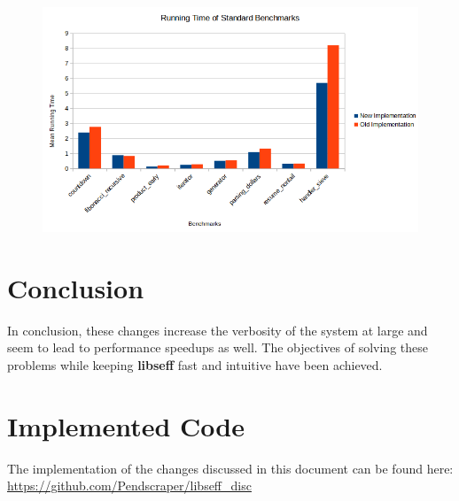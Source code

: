 \documentclass[logo,bsc,singlespacing,parskip,online]{infthesis}
\begin{document}
\begin{figure}[h]
    \centering
    \includegraphics[width=1\linewidth]{bench_tests.PNG}
    \label{fig:benches}
\end{figure}








\chapter{Conclusion}


In conclusion, these changes increase the verbosity of the system at large and seem to lead to performance speedups as well. The objectives of solving these problems while keeping \textbf{libseff} fast and intuitive have been achieved.

% 
%
%
\printbibliography

\nocite{*}


\appendix

\chapter{Implemented Code}

The implementation of the changes discussed in this document can be found here: 
\url{https://github.com/Pendscraper/libseff_disc}


\todos
\end{document}
